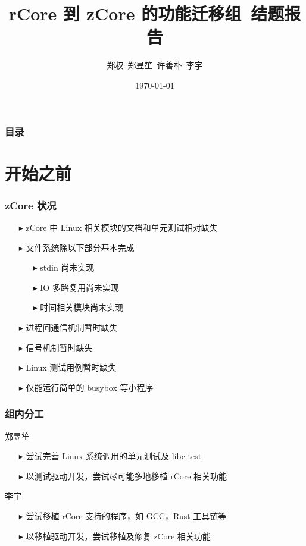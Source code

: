 \documentclass{beamer}
\newcommand{\tri}{$\blacktriangleright$}
\begin{document}
\begin{frame}
	\title{rCore 到 zCore 的功能迁移组\ 结题报告}
	\author{郑权\ 郑昱笙\ 许善朴\ 李宇}
	\date{\today}
	\titlepage
\end{frame}

\begin{frame}
	\frametitle{目录}
	\tableofcontents
\end{frame}

\section{开始之前}
\begin{frame}
	\frametitle{zCore 状况}
	\begin{itemize}
		\item [\tri] zCore 中 Linux 相关模块的文档和单元测试相对缺失
		\item [\tri] 文件系统除以下部分基本完成
		\begin{itemize}
			\item [\tri] stdin 尚未实现
			\item [\tri] IO 多路复用尚未实现
			\item [\tri] 时间相关模块尚未实现
		\end{itemize}
		\item [\tri] 进程间通信机制暂时缺失
		\item [\tri] 信号机制暂时缺失
		\item [\tri] Linux 测试用例暂时缺失
		\item [\tri] 仅能运行简单的 busybox 等小程序
	\end{itemize}
\end{frame}

\begin{frame}
	\frametitle{组内分工}
	郑昱笙
	\begin{itemize}
		\item [\tri] 尝试完善 Linux 系统调用的单元测试及 libc-test
		\item [\tri] 以测试驱动开发，尝试尽可能多地移植 rCore 相关功能
	\end{itemize}
	李宇
	\begin{itemize}
		\item [\tri] 尝试移植 rCore 支持的程序，如 GCC，Rust 工具链等
		\item [\tri] 以移植驱动开发，尝试移植及修复 zCore 相关功能
	\end{itemize}
\end{frame}
\end{document}
